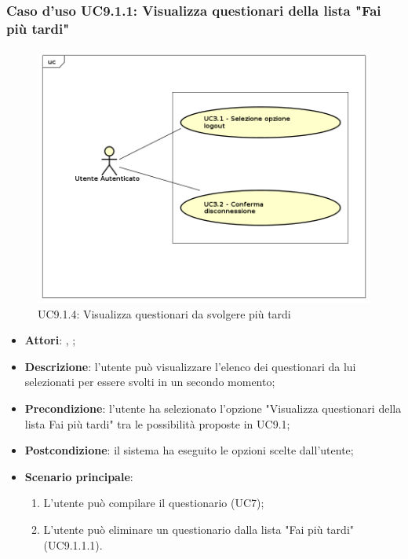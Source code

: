 			\subsubsection{Caso d'uso UC9.1.1: Visualizza questionari della lista "Fai più tardi"}
			\label{UC9.1.4}
			\begin{figure}[h]
				\centering
				\includegraphics[scale=0.7,keepaspectratio]{UML/UC9.png}
				\caption{UC9.1.4: Visualizza questionari da svolgere più tardi}
			\end{figure}
			\FloatBarrier
			\begin{itemize}
				\item \textbf{Attori}: \uau, \uaupro;
				\item \textbf{Descrizione}: l'utente può visualizzare l'elenco dei questionari da lui selezionati per essere svolti in un secondo momento;
				\item \textbf{Precondizione}: l'utente ha selezionato l'opzione "Visualizza questionari della lista Fai più tardi" tra le possibilità proposte in UC9.1;
				\item \textbf{Postcondizione}: il sistema ha eseguito le opzioni scelte dall'utente;
				\item \textbf{Scenario principale}: 
				\begin{enumerate}
					\item L'utente può compilare il questionario (UC7);
					\item L'utente può eliminare un questionario dalla lista "Fai più tardi" (UC9.1.1.1).
				\end{enumerate}
			\end{itemize}
				
